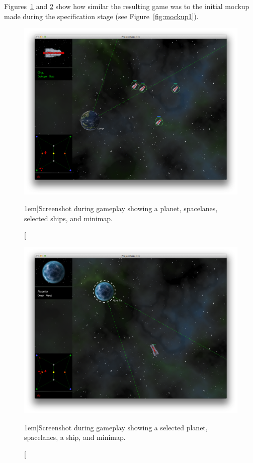Figures~\ref{fig:gameplay} and \ref{fig:gameplay2} show how similar the resulting game was to the initial mockup made during the specification stage (see Figure~\ref{fig:mockup1}).

\begin{figure}[p]
	\includegraphics[width=16cm]{res/serenityscreens/09-ingame1}
	\caption[][1em]{Screenshot during gameplay showing a planet, spacelanes, selected ships, and minimap.}
	\label{fig:gameplay}
\end{figure}

\begin{figure}[p]
	\includegraphics[width=16cm]{res/serenityscreens/10-ingame2}
	\caption[][1em]{Screenshot during gameplay showing a selected planet, spacelanes, a ship, and minimap.}
	\label{fig:gameplay2}
\end{figure}

